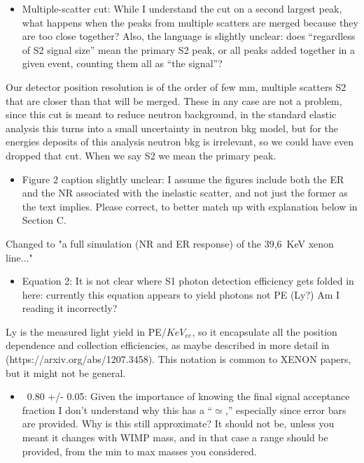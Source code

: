 \documentclass{article}
\begin{document}
\begin{itemize}
	\item {\color{blue} 
Multiple-scatter cut: While I understand the cut on a second largest
peak, what happens when the peaks from multiple scatters are merged
because they are too close together? Also, the language is slightly
unclear: does “regardless of S2 signal size” mean the primary S2 peak,
or all peaks added together in a given event, counting them all as
“the signal”?}
\end{itemize}

{\color{red} Our detector position resolution is of the order of few mm, multiple scatters S2 that are 
closer than that will be merged. These in any case are not a problem, since this cut is meant 
to reduce neutron background, in the standard elastic analysis this turns into a small
uncertainty in neutron bkg model, but for the energies deposits of this analysis neutron bkg 
is irrelevant, so we could have even dropped that cut. When we say S2 we mean the primary peak. } 

\begin{itemize}
	\item {\color{blue} 
Figure 2 caption slightly unclear: I assume the figures include both
the ER and the NR associated with the inelastic scatter, and not just
the former as the text implies. Please correct, to better match up
with explanation below in Section C.}
\end{itemize}

{\color{red} Changed to "a full simulation (NR and ER response) of the 39,6~KeV xenon line..." } 

\begin{itemize}
	\item {\color{blue} 
Equation 2: It is not clear where S1 photon detection efficiency gets
folded in here: currently this equation appears to yield photons not
PE (Ly?) Am I reading it incorrectly?}
\end{itemize}

Ly is the measured light yield in PE/$KeV_{ee}$, so it encapsulate all the position dependence
and collection efficiencies, as maybe described in more detail in 
(https://arxiv.org/abs/1207.3458). This notation is common to XENON papers, but it might not be 
general.


\begin{itemize}
	\item {\color{blue} 
~0.80 +/- 0.05: Given the importance of knowing the final signal
acceptance fraction I don’t understand why this has a “$\simeq$,” especially
since error bars are provided. Why is this still approximate? It
should not be, unless you meant it changes with WIMP mass, and in that
case a range should be provided, from the min to max masses you
considered.}
\end{itemize}
\end{document}
